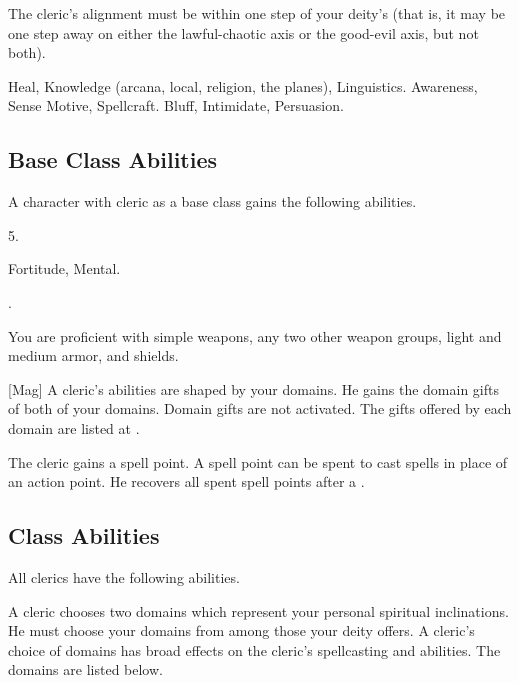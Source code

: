      The cleric's alignment must be within one step of your deity's (that is, it may be one step away on either the lawful-chaotic axis or the good-evil axis, but not both).

     Heal, Knowledge (arcana, local, religion, the planes), Linguistics.
     Awareness, Sense Motive, Spellcraft.
     Bluff, Intimidate, Persuasion.

    \subsection{Base Class Abilities}
        A character with cleric as a base class gains the following abilities.

         5.

          Fortitude,  Mental.

         .

        You are proficient with simple weapons, any two other weapon groups, light and medium armor, and shields.

        [Mag]
        A cleric's abilities are shaped by your domains.
        He gains the domain gifts of both of your domains.
        Domain gifts are not activated.
        The gifts offered by each domain are listed at .

        The cleric gains a spell point.
        A spell point can be spent to cast spells in place of an action point.
        He recovers all spent spell points after a .

    \subsection{Class Abilities}
        All clerics have the following abilities.

        A cleric chooses two domains which represent your personal spiritual inclinations.
        He must choose your domains from among those your deity offers.
        A cleric's choice of domains has broad effects on the cleric's spellcasting and abilities.
        The domains are listed below.

